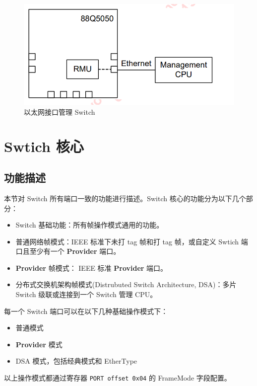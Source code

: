 \begin{figure}[ht]
    \centering
    \includegraphics[scale=0.7]{pic/Snipaste_2021-10-23_19-04-54.png}
    \caption{以太网接口管理 Switch}
    \label{fig:eth_interface}
\end{figure}

\section{Swtich 核心}
\subsection{功能描述} 
本节对 Switch 所有端口一致的功能进行描述。Switch 核心的功能分为以下几个部分：

\begin{itemize}
    \item Switch 基础功能：所有帧操作模式通用的功能。
    \item 普通网络帧模式：IEEE 标准下未打 tag 帧和打 tag 帧，或自定义 Swtich 端口且至少有一个 \textbf{Provider} 端口。
    \item \textbf{Provider} 帧模式： IEEE 标准 \textbf{Provider} 端口。
    \item 分布式交换机架构帧模式(Distrubuted Switch Architecture, DSA)：多片 Switch 级联或连接到一个 Switch 管理 CPU。
\end{itemize}

每一个 Switch 端口可以在以下几种基础操作模式下：
\begin{itemize}
    \item 普通模式
    \item \textbf{Provider} 模式
    \item DSA 模式，包括经典模式和 EtherType
\end{itemize}

以上操作模式都通过寄存器 \lstinline{PORT offset 0x04} 的 FrameMode 字段配置。

